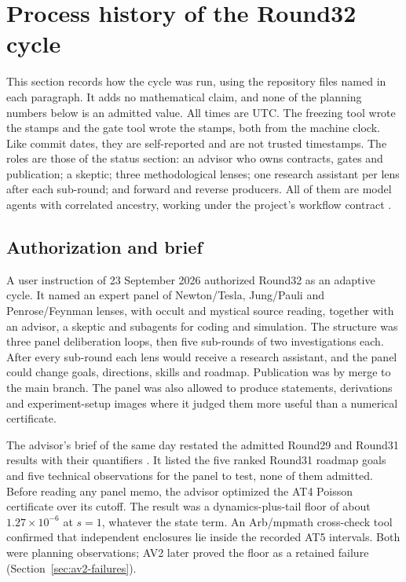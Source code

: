 \section{Process history of the Round32 cycle}
\label{sec:history}

This section records how the cycle was run, using the repository files named
in each paragraph. It adds no mathematical claim, and none of the planning
numbers below is an admitted value. All times are UTC. The freezing tool
wrote the  stamps and the gate tool wrote the
 stamps, both from the machine clock. Like commit
dates, they are self-reported and are not trusted timestamps. The roles are
those of the status section: an advisor who owns contracts, gates and
publication; a skeptic; three methodological lenses; one research assistant
per lens after each sub-round; and forward and reverse producers. All of them
are model agents with correlated ancestry, working under the project's
workflow contract \cite{agents}.

\subsection{Authorization and brief}
\label{sec:history-brief}
A user instruction of 23 September 2026 authorized Round32 as an adaptive
cycle. It named an expert panel of Newton/Tesla, Jung/Pauli and
Penrose/Feynman lenses, with occult and mystical source reading, together
with an advisor, a skeptic and subagents for coding and simulation. The
structure was three panel deliberation loops, then five sub-rounds of two
investigations each. After every sub-round each lens would receive a research
assistant, and the panel could change goals, directions, skills and roadmap.
Publication was by merge to the main branch. The panel was also allowed to
produce statements, derivations and experiment-setup images where it judged
them more useful than a numerical certificate.

The advisor's brief of the same day \cite{r32panel} restated the admitted
Round29 and Round31 results with their quantifiers
\cite{r29am,r29aq,r29al,r31at}. It listed the five ranked Round31 roadmap
goals and five technical observations for the panel to test, none of them
admitted. Before reading any panel memo, the advisor optimized the AT4
Poisson certificate over its cutoff. The result was a dynamics-plus-tail
floor of about $1.27\times10^{-6}$ at $s=1$, whatever the state term. An
Arb/mpmath cross-check tool \cite{flint,mpmath} confirmed that independent
enclosures lie inside the recorded AT5 intervals. Both were planning
observations; AV2 later proved the floor as a retained failure
(Section~\ref{sec:av2-failures}).

